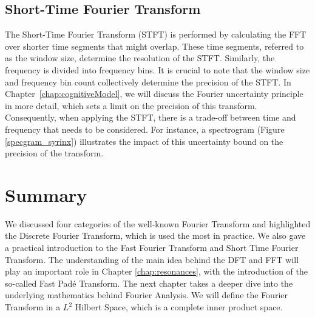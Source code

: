 \subsection{Short-Time Fourier Transform}


The Short-Time Fourier Transform (STFT) is performed by calculating the FFT over shorter time segments that might overlap. These time segments, referred to as the window size, determine the resolution of the STFT. Similarly, the frequency is divided into frequency bins. It is crucial to note that the window size and frequency bin count collectively determine the precision of the STFT. In Chapter~\ref{chap:cognitiveModel}, we will discuss the Fourier uncertainty principle in more detail, which sets a limit on the precision of this transform. Consequently, when applying the STFT, there is a trade-off between time and frequency that needs to be considered. For instance, a spectrogram (Figure \ref{specgram_syrinx}) illustrates the impact of this uncertainty bound on the precision of the transform.


\section{Summary}
We discussed four categories of the well-known Fourier Transform and highlighted the Discrete Fourier Transform, which is used the most in practice. We also gave a practical introduction to the Fast Fourier Transform and Short Time Fourier Transform. The understanding of the main idea behind the DFT and FFT will play an important role in Chapter \ref{chap:resonances}, with the introduction of the so-called Fast Padé Transform.
The next chapter takes a deeper dive into the underlying mathematics behind Fourier Analysis. We will define the Fourier Transform in a $L^2$ Hilbert Space, which is a complete inner product space.


